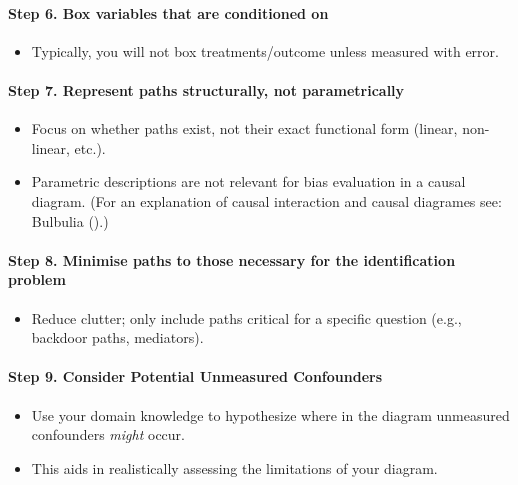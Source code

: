 \documentclass[
  singlecolumn]{article}
\let\oldparagraph\paragraph
\renewcommand{\paragraph}[1]{\oldparagraph{#1}\mbox{}}
\providecommand{\tightlist}{%
  \setlength{\itemsep}{0pt}\setlength{\parskip}{0pt}}\usepackage{longtable,booktabs,array}
\begin{document}
\paragraph{Step 6. Box variables that are conditioned
on}\label{step-6.-box-variables-that-are-conditioned-on}

\begin{itemize}
\tightlist
\item
  Typically, you will not box treatments/outcome unless measured with
  error.
\end{itemize}

\paragraph{Step 7. Represent paths structurally, not
parametrically}\label{step-7.-represent-paths-structurally-not-parametrically}

\begin{itemize}
\tightlist
\item
  Focus on whether paths exist, not their exact functional form (linear,
  non-linear, etc.).
\item
  Parametric descriptions are not relevant for bias evaluation in a
  causal diagram. (For an explanation of causal interaction and causal
  diagrames see: Bulbulia ().)
\end{itemize}

\paragraph{Step 8. Minimise paths to those necessary for the
identification
problem}\label{step-8.-minimise-paths-to-those-necessary-for-the-identification-problem}

\begin{itemize}
\tightlist
\item
  Reduce clutter; only include paths critical for a specific question
  (e.g., backdoor paths, mediators).
\end{itemize}

\paragraph{Step 9. Consider Potential Unmeasured
Confounders}\label{step-9.-consider-potential-unmeasured-confounders}

\begin{itemize}
\tightlist
\item
  Use your domain knowledge to hypothesize where in the diagram
  unmeasured confounders \emph{might} occur.
\item
  This aids in realistically assessing the limitations of your diagram.
\end{itemize}
\end{document}
